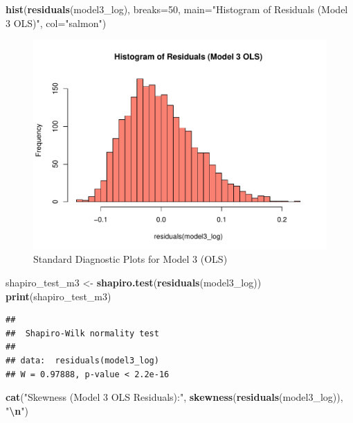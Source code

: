 \documentclass[
]{article}
\newenvironment{Shaded}{\begin{snugshade}}{\end{snugshade}}
\newcommand{\AttributeTok}[1]{\textcolor[rgb]{0.13,0.29,0.53}{#1}}
\newcommand{\DecValTok}[1]{\textcolor[rgb]{0.00,0.00,0.81}{#1}}
\newcommand{\FunctionTok}[1]{\textcolor[rgb]{0.13,0.29,0.53}{\textbf{#1}}}
\newcommand{\NormalTok}[1]{#1}
\newcommand{\OtherTok}[1]{\textcolor[rgb]{0.56,0.35,0.01}{#1}}
\newcommand{\SpecialCharTok}[1]{\textcolor[rgb]{0.81,0.36,0.00}{\textbf{#1}}}
\newcommand{\StringTok}[1]{\textcolor[rgb]{0.31,0.60,0.02}{#1}}
\begin{document}
\begin{Shaded}
\begin{Highlighting}[]
  \FunctionTok{hist}\NormalTok{(}\FunctionTok{residuals}\NormalTok{(model3\_log), }\AttributeTok{breaks=}\DecValTok{50}\NormalTok{, }\AttributeTok{main=}\StringTok{"Histogram of Residuals (Model 3 OLS)"}\NormalTok{, }\AttributeTok{col=}\StringTok{"salmon"}\NormalTok{)}
\end{Highlighting}
\end{Shaded}

\begin{figure}
\centering
\includegraphics{FinalProject_files/figure-latex/model3-parsimonious-log-log-3.pdf}
\caption{Standard Diagnostic Plots for Model 3 (OLS)}
\end{figure}

\begin{Shaded}
\begin{Highlighting}[]
\NormalTok{  shapiro\_test\_m3 }\OtherTok{\textless{}{-}} \FunctionTok{shapiro.test}\NormalTok{(}\FunctionTok{residuals}\NormalTok{(model3\_log))}
  \FunctionTok{print}\NormalTok{(shapiro\_test\_m3)}
\end{Highlighting}
\end{Shaded}

\begin{verbatim}
## 
##  Shapiro-Wilk normality test
## 
## data:  residuals(model3_log)
## W = 0.97888, p-value < 2.2e-16
\end{verbatim}

\begin{Shaded}
\begin{Highlighting}[]
  \FunctionTok{cat}\NormalTok{(}\StringTok{"Skewness (Model 3 OLS Residuals):"}\NormalTok{, }\FunctionTok{skewness}\NormalTok{(}\FunctionTok{residuals}\NormalTok{(model3\_log)), }\StringTok{"}\SpecialCharTok{\textbackslash{}n}\StringTok{"}\NormalTok{)}
\end{Highlighting}
\end{Shaded}
\end{document}
